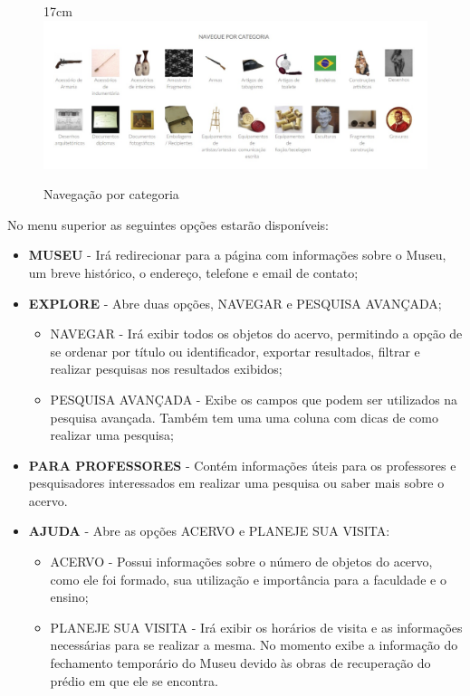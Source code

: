 \documentclass[a4paper,12pt,oneside,onecolumn,final,fleqn]{repUERJ}
\begin{document}
\begin{figure}[!ht]{17cm}
	\includegraphics[width=15cm, center]{figuras/pawtucket_navegacaocategoria.jpg}
	\caption{Navegação por categoria} \label{fig:tela_navcat}
\end{figure}

No menu superior as seguintes opções estarão disponíveis:

\begin{itemize}
	\item \textbf{MUSEU} - Irá redirecionar para a página com informações sobre o Museu, um breve histórico, o endereço, telefone e email de contato;
	\item \textbf{EXPLORE} - Abre duas opções, NAVEGAR e PESQUISA AVANÇADA;

	\begin{itemize}
		\item NAVEGAR - Irá exibir todos os objetos do acervo, permitindo a opção de se ordenar por título ou identificador, exportar resultados, filtrar e realizar pesquisas nos resultados exibidos;
		\item PESQUISA AVANÇADA - Exibe os campos que podem ser utilizados na pesquisa avançada. Também tem uma uma coluna com dicas de como realizar uma pesquisa;
	\end{itemize} 
	
	\item \textbf{PARA PROFESSORES} - Contém informações úteis para os professores e pesquisadores interessados em realizar uma pesquisa ou saber mais sobre o acervo.
	\item \textbf{AJUDA} - Abre as opções ACERVO e PLANEJE SUA VISITA:
	
	\begin{itemize}
	\item ACERVO - Possui informações sobre o número de objetos do acervo, como ele foi formado, sua utilização e importância para a faculdade e o ensino;
	\item PLANEJE SUA VISITA - Irá exibir os horários de visita e as informações necessárias para se realizar a mesma. No momento exibe a informação do fechamento temporário do Museu devido às obras de recuperação do prédio em que ele se encontra.
	
	\end{itemize}
\end{itemize}
\end{document}
